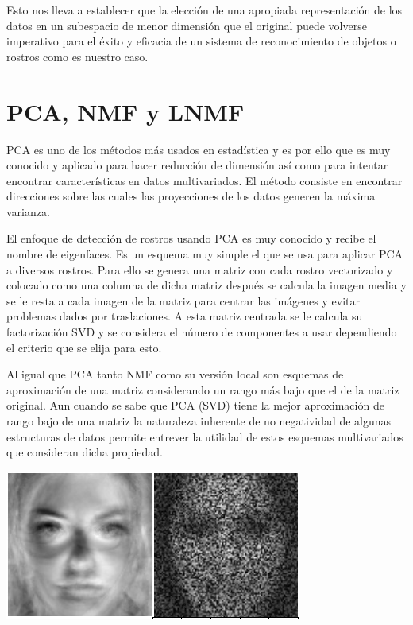 \documentclass[a0,portrait]{a0poster}
\begin{document}
\begin{multicols}{3}
Esto nos lleva a establecer que la elección de una apropiada representación de los datos en un subespacio de menor dimensión que el original puede volverse imperativo para el éxito y eficacia de un sistema de reconocimiento de objetos o rostros como es nuestro caso.
\color{Black} %

\section*{PCA, NMF y LNMF}
PCA es uno de los métodos más usados en estadística y es por ello que es muy conocido y aplicado para hacer reducción de dimensión así como para intentar encontrar características en datos multivariados. El método consiste en encontrar direcciones sobre las cuales las proyecciones de los datos generen la máxima varianza.\newline

El enfoque de detección de rostros usando PCA es muy conocido y recibe el nombre de eigenfaces. Es un esquema muy simple el que se usa para aplicar PCA a diversos rostros. Para ello se genera una matriz con cada rostro vectorizado y colocado como una columna de dicha matriz después se calcula la imagen media y se le resta a cada imagen de la matriz para centrar las imágenes y evitar problemas dados por traslaciones. A esta matriz centrada se le calcula su factorización SVD y se considera el número de componentes a usar dependiendo el criterio que se elija para esto.\newline

Al igual que PCA tanto NMF como su versión local son esquemas de aproximación de una matriz considerando un rango más bajo que el de la matriz original. Aun cuando se sabe que PCA (SVD) tiene la mejor aproximaci\'on de rango bajo de una matriz la naturaleza inherente de no negatividad de algunas estructuras de datos permite entrever la utilidad de estos esquemas multivariados que consideran dicha propiedad.\newline
\begin{center}\vspace{0.5cm}
\includegraphics[width=0.7\linewidth]{Sin_nombre}
\end{center}%



\end{multicols}
\end{document}
